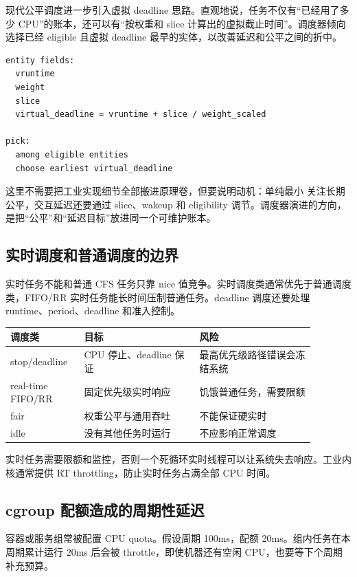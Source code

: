 现代公平调度进一步引入虚拟 deadline 思路。直观地说，任务不仅有“已经用了多少 CPU”的账本，还可以有“按权重和 slice 计算出的虚拟截止时间”。调度器倾向选择已经 eligible 且虚拟 deadline 最早的实体，以改善延迟和公平之间的折中。

\begin{lstlisting}
entity fields:
  vruntime
  weight
  slice
  virtual_deadline = vruntime + slice / weight_scaled

pick:
  among eligible entities
  choose earliest virtual_deadline
\end{lstlisting}

这里不需要把工业实现细节全部搬进原理卷，但要说明动机：单纯最小  关注长期公平，交互延迟还要通过 slice、wakeup 和 eligibility 调节。调度器演进的方向，是把“公平”和“延迟目标”放进同一个可维护账本。

\subsection{实时调度和普通调度的边界}

实时任务不能和普通 CFS 任务只靠 nice 值竞争。实时调度类通常优先于普通调度类，FIFO/RR 实时任务能长时间压制普通任务。deadline 调度还要处理 runtime、period、deadline 和准入控制。

\begin{longtable}{|p{0.2\linewidth}|p{0.34\linewidth}|p{0.34\linewidth}|}
\toprule
调度类 & 目标 & 风险 \\
\midrule
stop/deadline & CPU 停止、deadline 保证 & 最高优先级路径错误会冻结系统 \\\tablerowrule
real-time FIFO/RR & 固定优先级实时响应 & 饥饿普通任务，需要限额 \\\tablerowrule
fair & 权重公平与通用吞吐 & 不能保证硬实时 \\\tablerowrule
idle & 没有其他任务时运行 & 不应影响正常调度 \\
\bottomrule
\end{longtable}

实时任务需要限额和监控，否则一个死循环实时线程可以让系统失去响应。工业内核通常提供 RT throttling，防止实时任务占满全部 CPU 时间。

\subsection{cgroup 配额造成的周期性延迟}

容器或服务组常被配置 CPU quota。假设周期 100ms，配额 20ms。组内任务在本周期累计运行 20ms 后会被 throttle，即使机器还有空闲 CPU，也要等下个周期补充预算。

